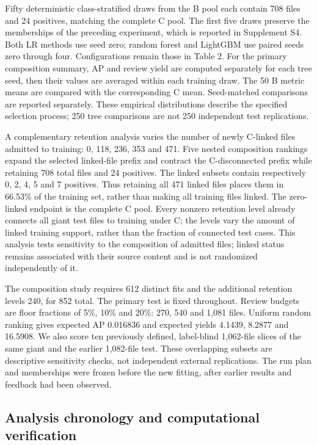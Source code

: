 \documentclass[preprint,12pt]{elsarticle}
\begin{document}
Fifty deterministic class-stratified draws from the B pool each contain 708 files and 24 positives, matching the complete C pool. The first five draws preserve the memberships of the preceding experiment, which is reported in Supplement S4. Both LR methods use seed zero; random forest and LightGBM use paired seeds zero through four. Configurations remain those in Table 2. For the primary composition summary, AP and review yield are computed separately for each tree seed, then their values are averaged within each training draw. The 50 B metric means are compared with the corresponding C mean. Seed-matched comparisons are reported separately. These empirical distributions describe the specified selection process; 250 tree comparisons are not 250 independent test replications.

A complementary retention analysis varies the number of newly C-linked files admitted to training: 0, 118, 236, 353 and 471. Five nested composition rankings expand the selected linked-file prefix and contract the C-disconnected prefix while retaining 708 total files and 24 positives. The linked subsets contain respectively 0, 2, 4, 5 and 7 positives. Thus retaining all 471 linked files places them in 66.53\% of the training set, rather than making all training files linked. The zero-linked endpoint is the complete C pool. Every nonzero retention level already connects all giant test files to training under C; the levels vary the amount of linked training support, rather than the fraction of connected test cases. This analysis tests sensitivity to the composition of admitted files; linked status remains associated with their source content and is not randomized independently of it.

The composition study requires 612 distinct fits and the additional retention levels 240, for 852 total. The primary test is fixed throughout. Review budgets are floor fractions of 5\%, 10\% and 20\%: 270, 540 and 1,081 files. Uniform random ranking gives expected AP 0.016836 and expected yields 4.1439, 8.2877 and 16.5908. We also score ten previously defined, label-blind 1,062-file slices of the same giant and the earlier 1,082-file test. These overlapping subsets are descriptive sensitivity checks, not independent external replications. The run plan and memberships were frozen before the new fitting, after earlier results and feedback had been observed.

\subsection{Analysis chronology and computational verification}\label{analysis-chronology-and-computational-verification}
\end{document}
